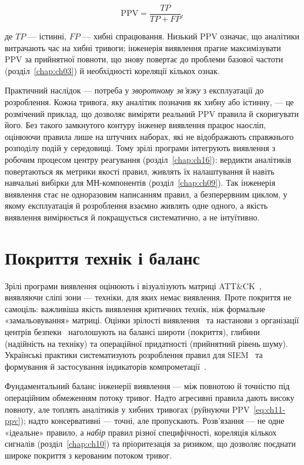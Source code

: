 \begin{equation}
\mathrm{PPV} = \frac{TP}{TP + FP},
\label{eq:ch11-ppv}
\end{equation}

де $TP$ --- істинні, $FP$ --- хибні спрацювання. Низький PPV означає, що аналітики витрачають час на хибні тривоги; інженерія виявлення прагне максимізувати PPV за прийнятної повноти, що знову повертає до проблеми базової частоти (розділ~\ref{chap:ch03}) й необхідності кореляції кількох ознак.

Практичний наслідок --- потреба у \emph{зворотному зв'язку} з експлуатації до розроблення. Кожна тривога, яку аналітик позначив як хибну або істинну, --- це розмічений приклад, що дозволяє виміряти реальний PPV правила й скоригувати його. Без такого замкнутого контуру інженер виявлення працює наосліп, оцінюючи правила лише на штучних наборах, які не відображають справжнього розподілу подій у середовищі. Тому зрілі програми інтегрують виявлення з робочим процесом центру реагування (розділ~\ref{chap:ch16}): вердикти аналітиків повертаються як метрики якості правил, живлять їх налаштування й навіть навчальні вибірки для МН-компонентів (розділ~\ref{chap:ch09}). Так інженерія виявлення стає не одноразовим написанням правил, а безперервним циклом, у якому експлуатація й розроблення взаємно живлять одне одного, а якість виявлення вимірюється й покращується систематично, а не інтуїтивно.

\section{Покриття технік і баланс}\label{sec:ch11-coverage}

Зрілі програми виявлення оцінюють і візуалізують  матриці ATT\&CK~\cite{mitre-attack}, виявляючи сліпі зони --- техніки, для яких немає виявлення. Проте покриття не самоціль: важливіша якість виявлення критичних технік, ніж формальне «замальовування» матриці. Оцінки зрілості виявлення~\cite{ch11:detection-maturity} та настанови з організації центрів безпеки~\cite{ch11:alerting} наголошують на балансі широти (покриття), глибини (надійність на техніку) та операційної придатності (прийнятний рівень шуму). Українські практики систематизують розроблення правил для SIEM~\cite{ch11:detection-ua} та формування й застосування індикаторів компрометації~\cite{ch11:ioc-ua}.

Фундаментальний баланс інженерії виявлення --- між повнотою й точністю під операційним обмеженням потоку тривог. Надто агресивні правила дають високу повноту, але топлять аналітиків у хибних тривогах (руйнуючи PPV~\eqref{eq:ch11-ppv}); надто консервативні --- точні, але пропускають. Розв'язання --- не одне «ідеальне» правило, а \emph{набір} правил різної специфічності, кореляція кількох сигналів (розділ~\ref{chap:ch10}) та пріоритезація за ризиком, що дозволяє поєднати широке покриття з керованим потоком тривог.

